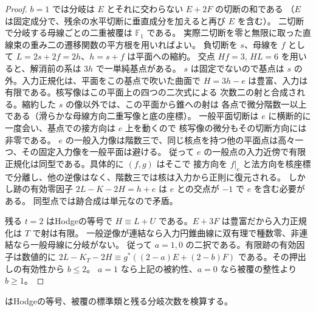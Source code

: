 \begin{proof}
$b=1$ では分岐は $E$ とそれに交わらない $E+2F$ の切断の和である
（$E$ は固定成分で、残余の水平切断に垂直成分を加えると再び $E$ を含む）。
二切断で分岐する母線ごとの二重被覆は $\mathbb F_1$ である。
実際二切断を零と無限に取った直線束の重み二の遷移関数の平方根を用いればよい。
負切断を $s$、母線を $f$ として $L=2s+2f=2h$、$h=s+f$ は平面への縮約。
交点 $Hf=3$, $HL=6$ を用いると、解消前の系は $3h$ で一単純基点がある。
$s$ は固定でないので基点は $s$ の外。入力正規化は、平面をこの基点で吹いた曲面で
$H=3h-e$ は豊富、入力は有限である。核写像はこの平面上の四つの二次式による
次数二の射と合成される。縮約した $s$ の像以外では、この平面から錐への射は
各点で微分階数一以上である（滑らかな母線方向二重写像と底の座標）。
一般平面切断は $e$ に横断的に一度会い、基点での接方向は $e$ 上を動くので
核写像の微分もその切断方向には非零である。
$e$ の一般入力像は階数三で、同じ核点を持つ他の平面点は高々一つ、その固定入力像を一般平面は避ける。
従って $e$ の一般点の入力近傍で有限正規化は同型である。具体的に $(f,g)$ はそこで
接方向を $f|_e$ と法方向を核座標で分離し、他の逆像はなく、階数三では核は入力から正則に復元される。
しかし跡の有効零因子 $2L-K-2H=h+e$ は $e$ との交点が $-1$ で $e$ を含む必要がある。
同型点では跡合成は単元なので矛盾。

残る $t=2$ はHodgeの等号で $H\equiv L+U$ である。$E+3F$ は豊富だから入力正規化は $T$ で射は有限。
一般逆像が連結なら入力円錐曲線に双有理で種数零、非連結なら一般母線に分岐がない。
従って $a=1,0$ の二択である。有限跡の有効因子は数値的に
$2L-K_T-2H\equiv g^*((2-a)E+(2-b)F)$ である。その押出しの有効性から $b\le2$。
$a=1$ なら上記の被約性、$a=0$ なら被覆の整性より $b\ge1$。
\end{proof}
 はHodgeの等号、被覆の標準類と残る分岐次数を検算する。
